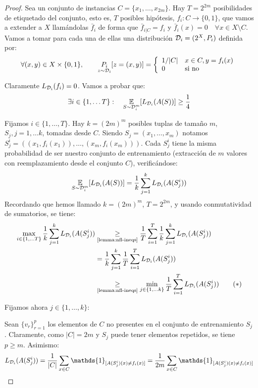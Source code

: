\begin{proof}
Sea un conjunto de instancias $C=\{x_1, \ldots, x_{2m}\}$. Hay $T = 2^{2m}$ posibilidades de etiquetado del conjunto,
esto es, $T$ posibles hipótesis, $f_i: C\rightarrow \{0,1\}$, que vamos a extender a $X$ llamándolas $\bar{f}_i$
de forma que $\bar{f}_{i|C} = f_i$ y $\bar{f}_i(x) = 0 \quad \forall x\in X\setminus C$. 
Vamos a tomar para cada una de ellas una distribución $\mathcal{D}_i=(2^X, P_i)$ definida por:
\[
  \forall (x,y)\in X \times \{0,1\}, \qquad \underset{z\sim \mathcal{D}_i}{P_i} [z = (x,y)] = 
  \left\{\begin{array}{ll}
         1/|C| & x \in C, y=f_i(x)\\
         0     & \textrm{si no}
  \end{array}\right. 
\]

Claramente $L_{\mathcal{D}_i}(f_i) = 0$. Vamos a probar que:
\[
  \exists i\in \{1, \ldots T\} : \quad \underset{S\sim \mathcal{D}_{i}^m}{\mathbb{E}} [L_{\mathcal{D}_i} (A(S))] \ge \frac{1}{4}
\]

Fijamos $i \in \{1, \ldots, T\}$. Hay $k = (2m)^m$ posibles tuplas de tamaño $m$, $S_{j}, j=1, \ldots k$, tomadas 
desde $C$. Siendo $S_j = (x_1, \ldots, x_m)$ notamos $S_j^i = ((x_1, f_i(x_1)), \ldots, (x_m, f_i(x_m)))$. Cada 
$S_j^i$ tiene la misma probabilidad de ser nuestro conjunto de entrenamiento (extracción de $m$ valores con 
reemplazamiento desde el conjunto $C$), verificándose:
\[
  \underset{S\sim \mathcal{D}_{i}^m}{\mathbb{E}} [L_{\mathcal{D}_i} (A(S))] = \frac{1}{k} \sum_{j=1}^k L_{\mathcal{D}_i} (A(S_j^i))
\]
Recordando que hemos llamado $k=(2m)^m$, $T=2^{2m}$, y usando conmutatividad de sumatorios, se tiene:
\begin{align}
\max_{i \in \{1,\ldots T\}} \frac{1}{k} \sum_{j=1}^{k} L_{\mathcal{D}_i} (A(S_j^i)) &\underset{\textrm{\ref{lemma:nfl-ineqs}}}{\ge }
       \frac{1}{T} \sum_{i=1}^{T} \frac{1}{k} \sum_{j=1}^{k}  L_{\mathcal{D}_i} (A(S_j^i)) \nonumber\\
&=     \frac{1}{k} \sum_{j=1}^{k} \frac{1}{T} \sum_{i=1}^{T}  L_{\mathcal{D}_i} (A(S_j^i)) \nonumber\\
&\underset{\textrm{\ref{lemma:nfl-ineqs}}}{\ge} \min_{j \in \{1, \ldots k\}} \frac{1}{T} \sum_{i=1}^{T}  L_{\mathcal{D}_i} (A(S_j^i)) 
\label{eqn:nfl-ineqs1}\tag{$\ast$}
\end{align}

Fijamos ahora $j \in \{1,\ldots, k\}$:

Sean $\{v_r\}_{r=1}^p$ los elementos de $C$ no presentes en el conjunto de entrenamiento $S_j$. 
Claramente, como $|C|=2m$ y $S_j$ puede tener elementos repetidos, se tiene $p \ge m$. Asimismo:
\[
  L_{\dist_i} (A(S^i_j)) = \frac{1}{|C|} \sum_{x\in C} \mathds{1}_{[A(S^i_j)(x) \neq f_i(x)]} = 
  \frac{1}{2m} \sum_{x \in C} \mathds{1}_{[A(S^i_j)(x) \neq f_i(x)]}
\]


\end{proof}
